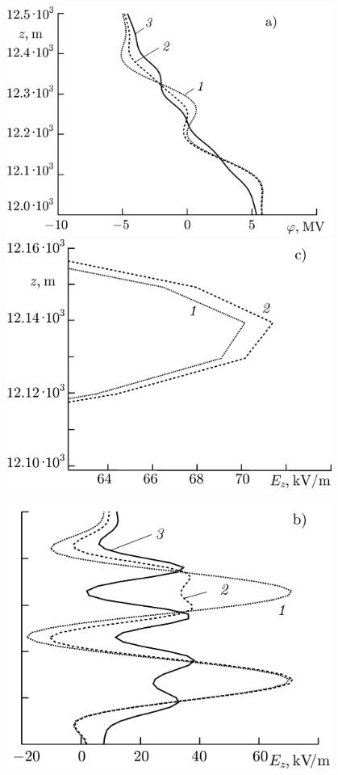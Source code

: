 \documentclass[a4paper, 12pt, onecolumn,singlespacing]{article}
\begin{document}
	\begin{figure}
		\label{fig:desenvolvimento_CID}
		\begin{minipage}{0.5\textwidth}
			\centering
			\includegraphics[width=0.95\textwidth]{imagens/12a.png}
			\includegraphics[width=0.95\textwidth]{imagens/13.png}
		\end{minipage}
		\begin{minipage}{0.5\textwidth}
			\centering
			\includegraphics[width=0.95\textwidth]{imagens/12b.png}

\end{minipage}
\end{figure}
\end{document}
